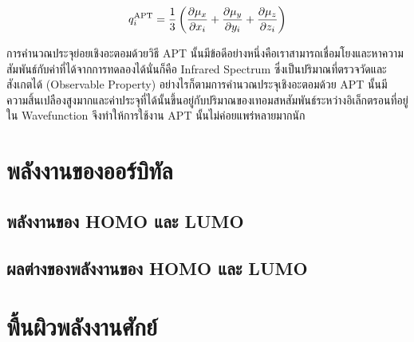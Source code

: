 \begin{enumerate}
          \begin{equation}\label{eq:apt_chage}
              q^{\text{APT}}_{i} = \frac{1}{3} \left( \pdv{\mu_{x}}{x_{i}} + \pdv{\mu_{y}}{y_{i}}
              + \pdv{\mu_{z}}{z_{i}} \right)
          \end{equation}

          การคำนวณประจุย่อยเชิงอะตอมด้วยวิธี APT นั้นมีข้อดีอย่างหนึ่งคือเราสามารถเชื่อมโยงและหาความสัมพันธ์กับค่าที่ได้จากการทดลองได้นั่นก็คือ
          Infrared Spectrum ซึ่งเป็นปริมาณที่ตรวจวัดและสังเกตได้ (Observable Property) อย่างไรก็ตามการคำนวณประจุเชิงอะตอมด้วย APT
          นั้นมีความสิ้นเปลืองสูงมากและค่าประจุที่ได้นั้นขึ้นอยู่กับปริมาณของเทอมสหสัมพันธ์ระหว่างอิเล็กตรอนที่อยู่ใน Wavefunction จึงทำให้การใช้งาน
          APT นั้นไม่ค่อยแพร่หลายมากนัก

\end{enumerate}

\section{พลังงานของออร์บิทัล}
\label{sec:ener_orb}


\subsection{พลังงานของ HOMO และ LUMO}
\label{ssec:ener_homo_lumo}



\subsection{ผลต่างของพลังงานของ HOMO และ LUMO}
\label{sec:ener_diff_orb}


\section{พื้นผิวพลังงานศักย์}
\label{sec:pes}

